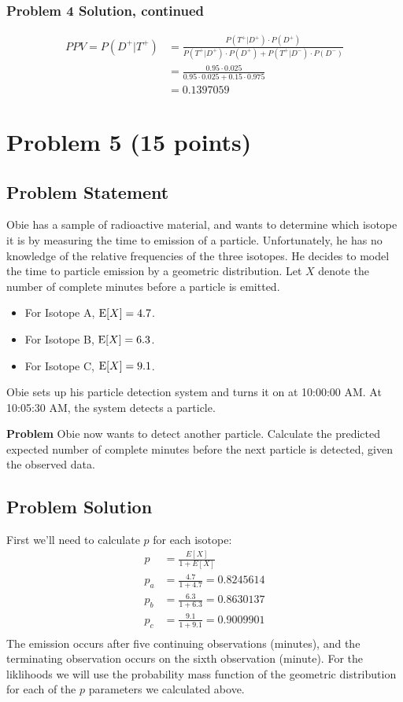 \documentclass[12pt]{article}
\theoremstyle{definition}
\begin{document}
	
\newpage
\subsubsection*{Problem 4 Solution, continued}

\begin{align*}
PPV = P(D^+|T^+) &= \frac{P(T^+|D^+) \cdot P(D^+)}{P(T^+|D^+) \cdot P(D^+) + P(T^+|D^-) \cdot P(D^-)}\\
&= \frac{0.95 \cdot 0.025}{0.95 \cdot 0.025 + 0.15 \cdot 0.975}\\
&= 0.1397059
\end{align*}

\newpage
\section*{Problem 5 (15 points)}

\subsection*{Problem Statement}

Obie has a sample of radioactive material, and wants to determine which isotope it is by measuring the time to emission of a particle. Unfortunately, he has no knowledge of the relative frequencies of the three isotopes. He decides to model the time to particle emission by a geometric distribution. Let $X$ denote the number of complete minutes before a particle is emitted.
\begin{itemize}
	\item For Isotope A, $\hbox{E}[X] = 4.7$.
	\item For Isotope B, $\hbox{E}[X] = 6.3$.
	\item For Isotope C, $\hbox{E}[X] = 9.1$.
\end{itemize}
Obie sets up his particle detection system and turns it on at 10:00:00 AM. At 10:05:30 AM, the system detects a particle.

\bigskip
\noindent
{\bf Problem} Obie now wants to detect another particle. Calculate the predicted expected number of complete minutes before the next particle is detected, given the observed data.

\subsection*{Problem Solution}
First we'll need to calculate $p$ for each isotope:
\begin{align*}
p &= \frac{E[X]}{1 + E[X]}\\
p_a &= \frac{4.7}{1 + 4.7} = 0.8245614\\
p_b &= \frac{6.3}{1 + 6.3} = 0.8630137\\
p_c &= \frac{9.1}{1 + 9.1} = 0.9009901\\
\end{align*}
The emission occurs after five continuing observations (minutes), and the terminating observation occurs on the sixth observation (minute). For the liklihoods we will use the probability mass function of the geometric distribution for each of the $p$ parameters we calculated above.
\end{document}
